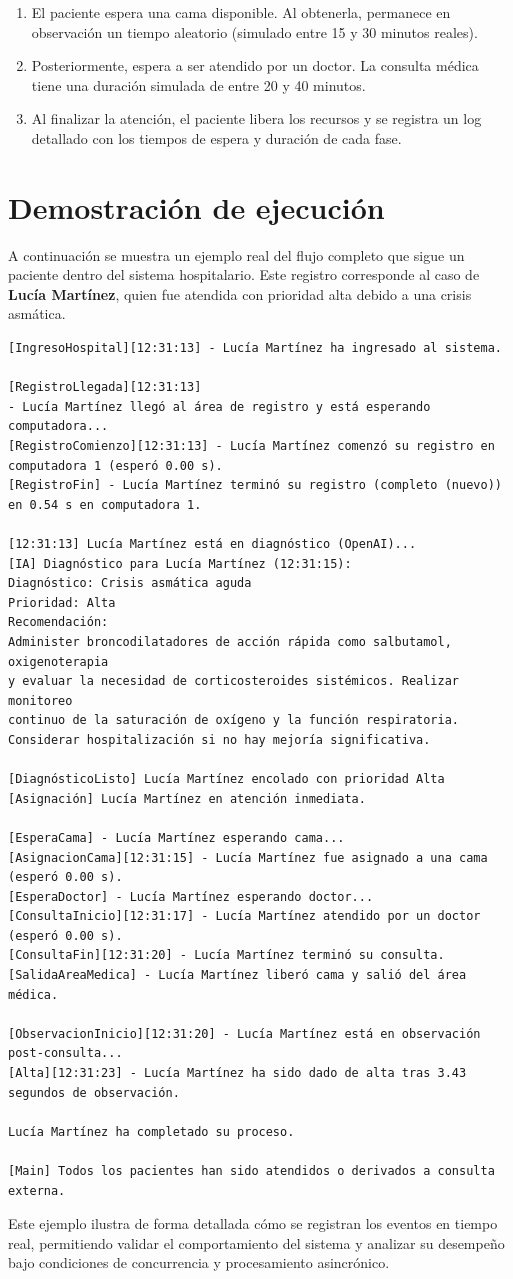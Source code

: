 \documentclass{article}
\begin{document}
\begin{enumerate}
    \item El paciente espera una cama disponible. Al obtenerla, permanece en observación un tiempo aleatorio (simulado entre 15 y 30 minutos reales).
    \item Posteriormente, espera a ser atendido por un doctor. La consulta médica tiene una duración simulada de entre 20 y 40 minutos.
    \item Al finalizar la atención, el paciente libera los recursos y se registra un log detallado con los tiempos de espera y duración de cada fase.
\end{enumerate}

\newpage

\section*{Demostración de ejecución}

A continuación se muestra un ejemplo real del flujo completo que sigue un paciente dentro del sistema hospitalario. Este registro corresponde al caso de \textbf{Lucía Martínez}, quien fue atendida con prioridad alta debido a una crisis asmática.

\begin{verbatim}
[IngresoHospital][12:31:13] - Lucía Martínez ha ingresado al sistema.

[RegistroLlegada][12:31:13] 
- Lucía Martínez llegó al área de registro y está esperando computadora...
[RegistroComienzo][12:31:13] - Lucía Martínez comenzó su registro en computadora 1 (esperó 0.00 s).
[RegistroFin] - Lucía Martínez terminó su registro (completo (nuevo)) en 0.54 s en computadora 1.

[12:31:13] Lucía Martínez está en diagnóstico (OpenAI)...
[IA] Diagnóstico para Lucía Martínez (12:31:15):
Diagnóstico: Crisis asmática aguda
Prioridad: Alta
Recomendación: 
Administer broncodilatadores de acción rápida como salbutamol, oxigenoterapia
y evaluar la necesidad de corticosteroides sistémicos. Realizar monitoreo
continuo de la saturación de oxígeno y la función respiratoria. 
Considerar hospitalización si no hay mejoría significativa.

[DiagnósticoListo] Lucía Martínez encolado con prioridad Alta
[Asignación] Lucía Martínez en atención inmediata.

[EsperaCama] - Lucía Martínez esperando cama...
[AsignacionCama][12:31:15] - Lucía Martínez fue asignado a una cama (esperó 0.00 s).
[EsperaDoctor] - Lucía Martínez esperando doctor...
[ConsultaInicio][12:31:17] - Lucía Martínez atendido por un doctor (esperó 0.00 s).
[ConsultaFin][12:31:20] - Lucía Martínez terminó su consulta.
[SalidaAreaMedica] - Lucía Martínez liberó cama y salió del área médica.

[ObservacionInicio][12:31:20] - Lucía Martínez está en observación post-consulta...
[Alta][12:31:23] - Lucía Martínez ha sido dado de alta tras 3.43 segundos de observación.

Lucía Martínez ha completado su proceso.

[Main] Todos los pacientes han sido atendidos o derivados a consulta externa.
\end{verbatim}

Este ejemplo ilustra de forma detallada cómo se registran los eventos en tiempo real, permitiendo validar el comportamiento del sistema y analizar su desempeño bajo condiciones de concurrencia y procesamiento asincrónico.
\end{document}
